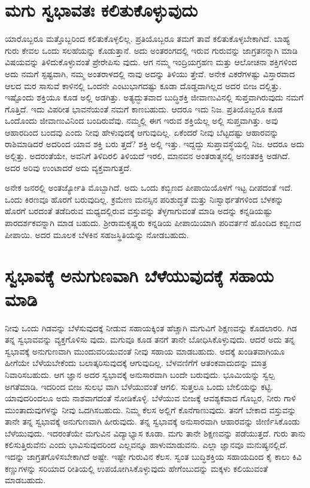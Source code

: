 \section{ಮಗು ಸ್ವಭಾವತಃ ಕಲಿತುಕೊಳ್ಳುವುದು}

ಯಾರೊಬ್ಬರೂ ಮತ್ತೊಬ್ಬರಿಂದ ಕಲಿತುಕೊಳ್ಳಲಿಲ್ಲ. ಪ್ರತಿಯೊಬ್ಬರೂ ತಮಗೆ ತಾವೆ ಕಲಿತುಕೊಳ್ಳಬೇಕಾಗಿದೆ. ಬಾಹ್ಯ ಗುರು ಕೇವಲ ಒಂದು ಸಲಹೆಯನ್ನು ಕೊಡುತ್ತಾನೆ. ಅದು ಅಂತರಂಗದಲ್ಲಿ ಇರುವ ಗುರುವನ್ನು ಜಾಗ್ರತನನ್ನಾಗಿ ಮಾಡಿ ವಿಷಯವನ್ನು ತಿಳಿದುಕೊಳ್ಳುವಂತೆ ಪ್ರೇರೇಪಿಸು ವುದು. ಆಗ ನಮ್ಮ ಇಂದ್ರಿಯಗ್ರಹಣ ಮತ್ತು ಆಲೋಚನಾ ಶಕ್ತಿಗಳಿಂದ ಅದು ನಮಗೆ ಸ್ಪಷ್ಟವಾಗಿ, ನಮ್ಮ ಅಂತರಾಳದಲ್ಲಿ ನಾವು ಅದನ್ನು ತಿಳಿಯು ತ್ತೇವೆ. ಅನೇಕ ಎಕರೆಗಳಷ್ಟು ವಿಸ್ತಾರವಾದ ಆಲದ ಮರ ಸಾಸುವೆ ಕಾಳಿನಲ್ಲಿ ಒಂದನೇ ಎಂಟುಭಾಗದಷ್ಟು ಕೂಡಾ ದೊಡ್ಡದಾಗಿಲ್ಲದ ಅದರ ಬೀಜ ದಲ್ಲಿತ್ತು. ಇಷ್ಟೊಂದು ಶಕ್ತಿಯೂ ಕೂಡ ಅಲ್ಲಿ ಅಡಗಿತ್ತು. ಅತ್ಯದ್ಭುತವಾದ ಬುದ್ಧಿಶಕ್ತಿ ಜೀವಾಣುವಿನಲ್ಲಿ ಸುಪ್ತವಾಗಿರುವುದು ನಮಗೆ ಗೊತ್ತಿದೆ. ಇದು ವಿಪರೀತ ಭಾವನೆಯಂತೆ ನಮಗೆ ಕಾಣಬಹುದು. ಆದರೂ ಇದು ನಿಜ. ಪ್ರತಿಯೊಬ್ಬರೂ ಕೂಡ ಒಂದೊಂದು ಜೀವಾಣುವಿನಿಂದ ಬಂದಿರುವೆವು. ನಮ್ಮಲ್ಲಿ ಈಗ ಇರುವ ಶಕ್ತಿಯೆಲ್ಲ ಅಲ್ಲಿ ಸುಪ್ತವಾಗಿತ್ತು. ಅವು ಆಹಾರದಿಂದ ಬಂದವು ಎಂದು ನೀವು ಹೇಳುವುದಕ್ಕೆ ಆಗುವುದಿಲ್ಲ. ಏಕೆಂದರೆ ನೀವು ಬೆಟ್ಟದಷ್ಟು ಆಹಾರವನ್ನು ರಾಶಿಮಾಡಿದರೆ ಅದರಿಂದ ಯಾವ ಶಕ್ತಿ ಬರು ತ್ತದೆ? ಶಕ್ತಿ ಅಲ್ಲಿ ಇತ್ತು. ಇದ್ದದ್ದು ಸುಪ್ತಾವಸ್ಥೆಯಲ್ಲಿ ನಿಜ. ಆದರೂ ಅದು ಅಲ್ಲಿತ್ತು. ಅದರಂತೆಯೇ, ಅವನಿಗೆ ತಿಳಿದಿರಲಿ ತಿಳಿಯದೆ ಇರಲಿ, ಮಾನವನ ಅಂತರಾತ್ಮನಲ್ಲಿ ಅನಂತಶಕ್ತಿ ಅಡಗಿದೆ. ಅದರ ಅರಿವು ಉಂಟಾದರೆ ಅದು ವ್ಯಕ್ತವಾಗುತ್ತದೆ.

ಅನೇಕ ಜನರಲ್ಲಿ ಅಂತರ್ಜ್ಯೋತಿ ಮೊಬ್ಬಾಗಿದೆ. ಅದು ಒಂದು ಕಬ್ಬಿಣದ ಪೀಪಾಯಿಯೊಳಗೆ ಇಟ್ಟ ದೀಪದಂತೆ ಇದೆ. ಒಂದು ಕಿರಣವೂ ಹೊರಗೆ ಬರುವುದಿಲ್ಲ. ಕ್ರಮೇಣ ಮನಸ್ಸಿನ ಪರಿಶುದ್ಧತೆ ಮತ್ತು ನಿಃಸ್ವಾರ್ಥತೆಗಳಿಂದ ಬೆಳಕನ್ನು ಹೊರಗೆ ಬರದಂತೆ ತಡೆದಿರುವ ಮಧ್ಯದಲ್ಲಿರುವ ವಸ್ತುವನ್ನು ತೆಳ್ಳಗಾಗುವಂತೆ ಮಾಡಿ ಅದನ್ನು ಕನ್ನಡಿಯಷ್ಟು ಪಾರದರ್ಶಕವನ್ನಾಗಿ ಮಾಡ ಬಹುದು. ಶ್ರೀರಾಮಕೃಷ್ಣರು ಕನ್ನಡಿಯ ಪೀಪಾಯಿಯಾಗಿ ಪರಿವರ್ತನೆ ಹೊಂದಿದ ಕಬ್ಬಿಣದ ಪೀಪಾಯಿ. ಅದರ ಮೂಲಕ ಬೆಳಕಿನ ಸಹಜಸ್ಥಿತಿಯನ್ನು ನೋಡಬಹುದು.


\section{ಸ್ವಭಾವಕ್ಕೆ ಅನುಗುಣವಾಗಿ ಬೆಳೆಯುವುದಕ್ಕೆ ಸಹಾಯ ಮಾಡಿ}

ನೀವು ಒಂದು ಗಿಡವನ್ನು ಬೆಳೆಸುವುದಕ್ಕೆ ನೀಡುವ ಸಹಾಯಕ್ಕಿಂತ ಹೆಚ್ಚಾಗಿ ಮಗುವಿಗೆ ಶಿಕ್ಷಣವನ್ನು ಕೊಡಲಾರರಿ. ಗಿಡ ತನ್ನ ಸ್ವಭಾವವನ್ನು ವ್ಯಕ್ತಗೊಳಿಸು ವುದು. ಮಗುವೂ ಕೂಡ ತನಗೆ ತಾನೇ ಬೋಧಿಸಿಕೊಳ್ಳುವುದು. ಆದರೆ ಅದು ತನ್ನ ಸ್ವಭಾವಕ್ಕೆ ಅನುಗುಣವಾಗಿ ಮುಂದುವರಿಯುವಂತೆ ನೀವು ಸಹಾಯ ಮಾಡಬಹುದು. ಅದಕ್ಕೆ ಖಂಡಿತವಾಗಿಯೂ ಹೀಗೆಯೇ ಬೆಳೆಯಬೇಕೆಂದು ಬಲಾತ್ಕರಿಸುವುದಕ್ಕೆ ಆಗುವುದಿಲ್ಲ. ಬೆಳವಣಿಗೆಗೆ ಆತಂಕವಾದುದನ್ನು ಮಾತ್ರ ನಿವಾರಿಸಬಹುದು. ಆಗ ಜ್ಞಾನ ಅದರ ಸ್ವಭಾವಕ್ಕೆ ಅನುಸಾರವಾಗಿ ಬಂದೇ ಬರುವುದು. ಭೂಮಿಯನ್ನು ಸ್ವಲ್ಪ ಅಗತೆಮಾಡಿ. ಇದರಿಂದ ಬೀಜ ಸುಲಭ ವಾಗಿ ಬೆಳೆಯುವಂತೆ ಆಗಲಿ. ಸುತ್ತಲೂ ಒಂದು ಬೇಲಿಯನ್ನು ಕಟ್ಟಿ. ಯಾವುದರಿಂದಲೂ ಅದು ನಾಶವಾಗದಂತೆ ನೋಡಿಕೊಳ್ಳಿ. ಬೆಳೆಯುವ ಬೀಜಕ್ಕೆ ಆವಶ್ಯಕವಾದ ಗೊಬ್ಬರ, ನೀರು ಗಾಳಿ ಮುಂತಾದುವುಗಳನ್ನು ನೀವು ಒದಗಿಸಬಹುದು. ನಿಮ್ಮ ಕೆಲಸ ಅಲ್ಲಿಗೆ ಕೊನೆಗಾಣುವುದು. ತನಗೆ ಬೇಕಾದ ವಸ್ತುವನ್ನು ತಾನೇ ತನ್ನ ಸ್ವಭಾವಕ್ಕೆ ಅನುಗುಣವಾಗಿ ಹೀರುವುದು. ತನ್ನ ಸ್ವಭಾವಕ್ಕೆ ಅನುಸಾರವಾಗಿ ಆಹಾರವನ್ನು ಜೀರ್ಣಿಸಿಕೊಂಡು ಬೆಳೆಯುವುದು. ಇದರಂತೆಯೇ ಮಗುವಿನ ವಿದ್ಯಾಭ್ಯಾಸ ಕೂಡಾ. ಮಗು ತಾನೇ ಶಿಕ್ಷಣವನ್ನು ಪಡೆಯುತ್ತದೆ. ಗುರು ತಾನು ಕಲಿಸುತ್ತಿರುವೆನು ಎಂದು ಭಾವಿಸುವುದರಿಂದ ಎಲ್ಲವನ್ನೂ ಹಾಳುಮಾಡುವನು. ಎಲ್ಲಾ ಜ್ಞಾನವೂ ಮನುಷ್ಯನಲ್ಲಿದೆ. ಇದನ್ನು ಜಾಗ್ರತಗೊಳಿಸಬೇಕಾಗಿದೆ ಅಷ್ಟೇ. ಇಷ್ಟೇ ಗುರುವಿನ ಕೆಲಸ. ಸ್ವಂತ ಬುದ್ಧಿಶಕ್ತಿಯ ಸಹಾಯದಿಂದ ಕೈ ಕಾಲು ಕಿವಿ ಕಣ್ಣುಗಳನ್ನು ಸರಿಯಾದ ರೀತಿಯಲ್ಲಿ ಉಪಯೋಗಿಸಿಕೊಳ್ಳುವುದು ಹೇಗೆಂಬುದನ್ನು ಮಕ್ಕಳು ಕಲಿಯುವಂತೆ ಮಾಡಬಹುದು.


